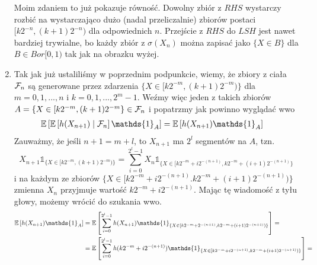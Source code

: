 \begin{solution}
\begin{enumerate}[label=(\alph*)]
\begin{center}
\end{center}
      Moim zdaniem to już pokazuje równość. Dowolny zbiór z $RHS$ wystarczy rozbić na wystarczająco dużo (nadal przeliczalnie) zbiorów postaci $[k 2^{-n}, (k+1)2^{-n})$ dla odpowiednich $n$. Przejście z $RHS$ do $LSH$ jest nawet bardziej trywialne, bo każdy zbiór z $\sigma(X_n)$ można zapisać jako $\{X\in B\}$ dla $B\in Bor[0, 1)$ tak jak na obrazku wyżej.
    \item Tak jak już ustaliliśmy w poprzednim podpunkcie, wiemy, że zbiory z ciała $\mathcal{F}_n$ są generowane przez zdarzenia $\{X\in[k2^{-m}, (k+1)2^{-m})\}$ dla $m=0,1,..., n$ i $k=0,1,...,2^m-1$. Weźmy więc jeden z takich zbiorów $A=\{X\in[k2^{-m}, (k+1)2^{-m}\}\in\mathcal{F}_n$ i popatrzmy jak powinno wyglądać wwo
      \begin{align*}
        \expected{\expected{h(X_{n+1})}{\set{F}_n}\mathds{1}_A}&=\expected{h(X_{n+1})\mathds{1}_A}
      \end{align*}
      Zauważmy, że jeśli $n+1=m+l$, to $X_{n+1}$ ma $2^l$ segmentów na $A$, tzn.
      $$X_{n+1}\mathds{1}_{\{X\in[k2^{-m}, (k+1)2^{-m})\}}=\sum_{i=0}^{2^l-1}X_n\mathds{1}_{\{X\in [k2^{-m}+i2^{-(n+1)}, k2^{-m}+(i+1)2^{-(n+1)}\}}$$
      i na każdym ze zbiorów $\{X\in[k2^{-m}+i2^{-(n+1)}. k2^{-m}+(i+1)2^{-(n+1)})\}$ zmienna $X_n$ przyjmuje wartość $k2^{-m}+i2^{-(n+1)}$. Mając tę wiadomość z tyłu głowy, możemy wrócić do szukania wwo.
      \begin{align*}
        \expected{h(X_{n+1})\mathds{1}_A}&=\expected{\sum_{i=0}^{2^l-1}h(X_{n+1})\mathds{1}_{\{X\in[k2^{-m}+2^{-(n+1)}, k2^{-m}+(i+1)2^{-(n+1)})\}}}=\\ 
                                         &=\expected{\sum_{i=0}^{2^l-1}h(k2^{-m}+i2^{-(n+1)})\mathds{1}_{\{X\in[k2^{-m}+i2^{-(n+1)}, k2^{-m}+(i+1)2^{-(n+1)})\}}}=\\ 

\end{align*}
\end{enumerate}
\end{solution}
